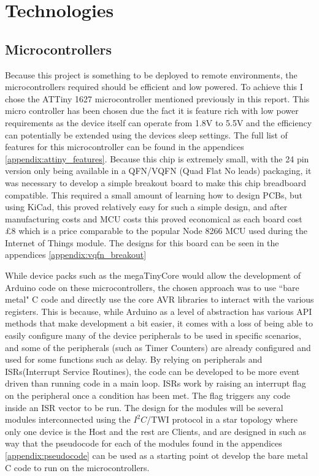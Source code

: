 \documentclass[11pt,a4paper,titlepage]{report}
\begin{document}
	\section*{Technologies}
	\subsection*{Microcontrollers}
	Because this project is something to be deployed to remote environments, the microcontrollers required should be efficient and low powered. To achieve this I chose the ATTiny 1627 microcontroller mentioned previously in this report. This micro controller has been chosen due the fact it is feature rich with low power requirements as the device itself can operate from 1.8\unit{\volt} to 5.5\unit{\volt} and the efficiency can potentially be extended using the devices sleep settings. The full list of features for this microcontroller can be found in the appendices \ref{appendix:attiny_features}. Because this chip is extremely small, with the 24 pin version only being available in a QFN/VQFN (Quad Flat No leads) packaging, it was necessary to develop a simple breakout board to make this chip breadboard compatible. This required a small amount of learning how to design PCBs, but using KiCad\cite{KICAD}, this proved relatively easy for such a simple design, and after manufacturing costs and MCU costs this proved economical as each board cost \unit{\approx}£8 which is a price comparable to the popular Node 8266 MCU used during the Internet of Things module. The designs for this board can be seen in the appendices \ref{appendix:vqfn_breakout}
	
	While device packs such as the megaTinyCore\cite{MEGATINYCORE} would allow the development of Arduino code on these microcontrollers, the chosen approach was to use ``bare metal" C code and directly use the core AVR libraries to interact with the various registers. This is because, while Arduino as a level of abstraction has various API methods that make development a bit easier, it comes with a loss of being able to easily configure many of the device peripherals to be used in specific scenarios, and some of the peripherals (such as Timer Counters) are already configured and used for some functions such as delay. By relying on peripherals and ISRs(Interrupt Service Routines), the code can be developed to be more event driven than running code in a main loop. ISRs work by raising an interrupt flag on the peripheral once a condition has been met. The flag triggers any code inside an ISR vector to be run. The design for the modules will be several modules interconnected using the $I^{2}C$/TWI protocol in a star topology where only one device is the Host and the rest are Clients, and are designed in such as way that the pseudocode for each of the modules found in the appendices \ref{appendix:pseudocode} can be used as a starting point ot develop the bare metal C code to run on the microcontrollers. 
	
\end{document}
